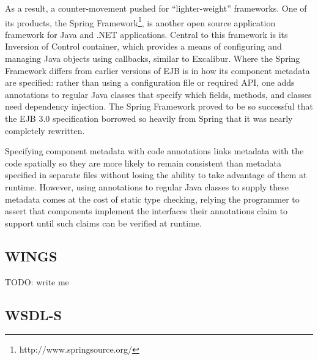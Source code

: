 \documentclass{article}
\begin{document}
As a result, a counter-movement pushed for ``lighter-weight'' frameworks.
One of its products, the Spring
Framework\footnote{http://www.springsource.org/}, is another open source
application framework for Java and .NET applications.  Central to
this framework is its Inversion of Control container, which provides
a means of configuring and managing Java objects using callbacks,
similar to Excalibur.  Where the Spring Framework differs from earlier
versions of EJB is in how its component metadata are specified: rather
than using a configuration file or required API, one adds annotations to
regular Java classes that specify which fields, methods, and classes need
dependency injection.  The Spring Framework proved to be so successful
that the EJB 3.0 specification borrowed so heavily from Spring that it
was nearly completely rewritten.

Specifying component metadata with code annotations links metadata
with the code spatially so they are more likely to remain consistent than
metadata specified in separate files without losing the ability to take
advantage of them at runtime.  However, using annotations to regular
Java classes to supply these metadata comes at the cost of static
type checking, relying the programmer to assert that components
implement the interfaces their annotations claim to support until such
claims can be verified at runtime.


\subsection{WINGS}

TODO:  write me


\subsection{WSDL-S}
\end{document}
